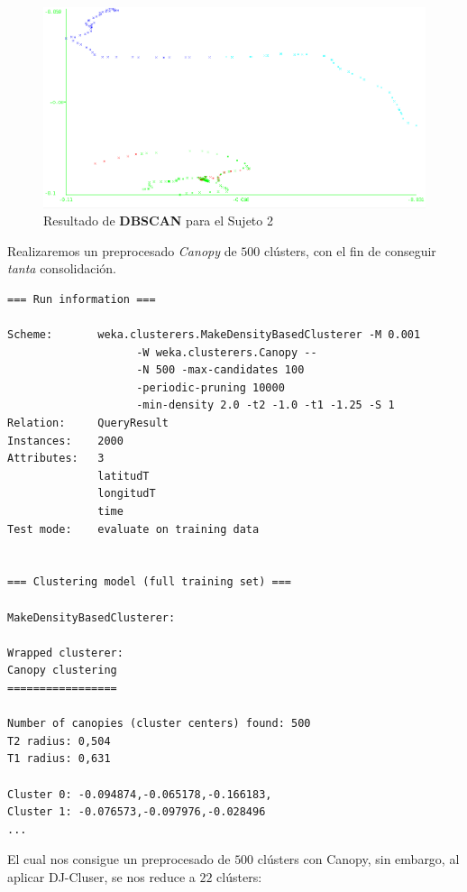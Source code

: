 \documentclass[a4paper, 12pt, spanish]{article}
\begin{document}
\begin{figure}[H]
	\includegraphics[scale=.5]{../comparativa/djClusterPruebaCanopySin.png}
	\caption{Resultado de \textbf{DBSCAN} para el Sujeto 2}
\end{figure}


Realizaremos un preprocesado \textit{Canopy} de $500$ cl\'usters, con el fin de conseguir \textit{tanta} consolidaci\'on.\\

\begin{verbatim}
=== Run information ===

Scheme:       weka.clusterers.MakeDensityBasedClusterer -M 0.001 
					-W weka.clusterers.Canopy -- 
					-N 500 -max-candidates 100 
					-periodic-pruning 10000 
					-min-density 2.0 -t2 -1.0 -t1 -1.25 -S 1
Relation:     QueryResult
Instances:    2000
Attributes:   3
              latitudT
              longitudT
              time
Test mode:    evaluate on training data


=== Clustering model (full training set) ===

MakeDensityBasedClusterer: 

Wrapped clusterer: 
Canopy clustering
=================

Number of canopies (cluster centers) found: 500
T2 radius: 0,504     
T1 radius: 0,631     

Cluster 0: -0.094874,-0.065178,-0.166183,
Cluster 1: -0.076573,-0.097976,-0.028496
...
\end{verbatim}

El cual nos consigue un preprocesado de $500$ cl\'usters con Canopy, sin embargo, al aplicar DJ-Cluser, se nos reduce a $22$ cl\'usters:\\
\end{document}
